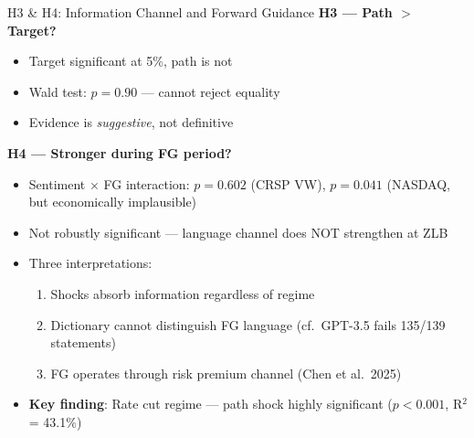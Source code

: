 \documentclass[aspectratio=169, 11pt]{beamer}
\begin{document}
\begin{frame}{H3 \& H4: Information Channel and Forward Guidance}
\textbf{H3 --- Path $>$ Target?}
\begin{itemize}
  \item Target significant at 5\%, path is not
  \item Wald test: $p = 0.90$ --- cannot reject equality
  \item Evidence is \textit{suggestive}, not definitive
\end{itemize}

\vspace{0.8em}
\textbf{H4 --- Stronger during FG period?}
\begin{itemize}
  \item Sentiment $\times$ FG interaction: $p = 0.602$ (CRSP VW), $p = 0.041$ (NASDAQ, but economically implausible)
  \item \alert{Not robustly significant} --- language channel does NOT strengthen at ZLB
  \item Three interpretations:
    \begin{enumerate}
      \item Shocks absorb information regardless of regime
      \item Dictionary cannot distinguish FG language (cf.\ GPT-3.5 fails 135/139 statements)
      \item FG operates through risk premium channel (Chen et al.\ 2025)
    \end{enumerate}
  \item \textbf{Key finding}: Rate cut regime --- path shock \alert{highly significant} ($p < 0.001$, R$^2$ = 43.1\%)
\end{itemize}
\end{frame}
\end{document}
